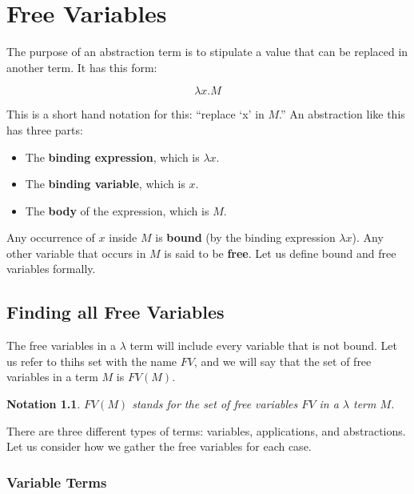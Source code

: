 \documentclass{book}
\numberwithin{equation}{chapter}
\newcommand{\vocab}{\textbf}
\newtheorem{notation}{Notation}
\begin{document}
\chapter{Free Variables}

The purpose of an abstraction term is to stipulate a value that can be replaced in another term. It has this form:

\begin{equation}
\lambda x.M
\end{equation}

\noindent
This is a short hand notation for this: ``replace `x' in $M$.'' An abstraction like this has three parts:

\begin{itemize}
\item{The \vocab{binding expression}, which is $\lambda x.$}
\item{The \vocab{binding variable}, which is $x$.}
\item{The \vocab{body} of the expression, which is $M$.}
\end{itemize}

\noindent
Any occurrence of $x$ inside $M$ is \vocab{bound} (by the binding expression $\lambda x$). Any other variable that occurs in $M$ is said to be \vocab{free}. Let us define bound and free variables formally.


\section{Finding all Free Variables}

The free variables in a $\lambda$ term will include every variable that is not bound. Let us refer to thihs set with the name $FV$, and we will say that the set of free variables in a term $M$ is $FV(M)$.

\begin{notation}
$FV(M)$ stands for the set of free variables $FV$ in a $\lambda$ term $M$. 
\end{notation}

\noindent
There are three different types of terms: variables, applications, and abstractions. Let us consider how we gather the free variables for each case.


\subsection{Variable Terms}
\end{document}
